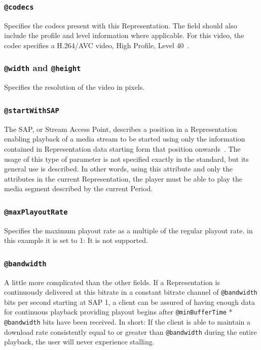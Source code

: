 \subsubsection{\texttt{@codecs}}
Specifies the codecs present with this
Representation. The field should also include the profile and level
information where applicable. For this video, the codec specifies a
H.264/AVC video, High Profile, Level 40~\cite[p. 12]{rfc6381}.

\subsubsection{\texttt{@width} and \texttt{@height}}
Specifies the resolution of the video in pixels.

\subsubsection{\texttt{@startWithSAP}}
The SAP, or Stream Access Point, describes a position in a Representation
enabling playback of a media stream to be started using only the information
contained in Representation data starting form that position
onwards~\cite[p. 11]{iso-dash-2014}. The usage of this type of parameter
is not specified exactly in the standard, but its general use is described.
In other words, using this attribute and only the attributes in the
current Representation, the player must be able to play the media segment
described by the current Period.

\subsubsection{\texttt{@maxPlayoutRate}}
Specifies the maximum playout rate as a multiple of the
regular playout rate. in this example it is set to 1: It is not supported.

\subsubsection{\texttt{@bandwidth}}
A little more complicated than the other fields.
If a Representation is continuously delivered at this bitrate in a
constant bitrate channel of \texttt{@bandwidth} bits per second starting at
SAP 1, a client
can be assured of having enough data for continuous playback providing
playout begins after \texttt{@minBufferTime} * \texttt{@bandwidth} bits have been
received. In short: If the client is able to maintain a download rate
consistently equal to or greater than \texttt{@bandwidth} during the entire
playback, the user will never experience stalling.

